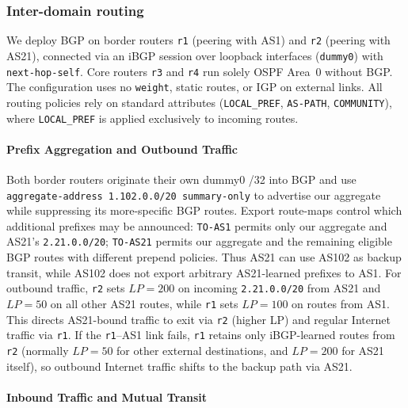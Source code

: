 \documentclass{article}
\begin{document}
\subsubsection{Inter-domain routing}

We deploy BGP on border routers \texttt{r1} (peering with AS1) and \texttt{r2} (peering with AS21), connected via an iBGP session over loopback interfaces (\texttt{dummy0}) with \texttt{next-hop-self}. Core routers \texttt{r3} and \texttt{r4} run solely OSPF Area~0 without BGP. The configuration uses no \texttt{weight}, static routes, or IGP on external links. All routing policies rely on standard attributes (\texttt{LOCAL\_PREF}, \texttt{AS-PATH}, \texttt{COMMUNITY}), where \texttt{LOCAL\_PREF} is applied exclusively to incoming routes.

\paragraph{Prefix Aggregation and Outbound Traffic}

Both border routers originate their own dummy0 /32 into BGP and use \texttt{aggregate-address 1.102.0.0/20 summary-only} to advertise our aggregate while suppressing its more-specific BGP routes. Export route-maps control which additional prefixes may be announced: \texttt{TO-AS1} permits only our aggregate and AS21's \texttt{2.21.0.0/20}; \texttt{TO-AS21} permits our aggregate and the remaining eligible BGP routes with different prepend policies. Thus AS21 can use AS102 as backup transit, while AS102 does not export arbitrary AS21-learned prefixes to AS1. For outbound traffic, \texttt{r2} sets $LP = 200$ on incoming \texttt{2.21.0.0/20} from AS21 and $LP = 50$ on all other AS21 routes, while \texttt{r1} sets $LP = 100$ on routes from AS1. This directs AS21-bound traffic to exit via \texttt{r2} (higher LP) and regular Internet traffic via \texttt{r1}. If the \texttt{r1}--AS1 link fails, \texttt{r1} retains only iBGP-learned routes from \texttt{r2} (normally $LP = 50$ for other external destinations, and $LP = 200$ for AS21 itself), so outbound Internet traffic shifts to the backup path via AS21.

\paragraph{Inbound Traffic and Mutual Transit}
\end{document}
